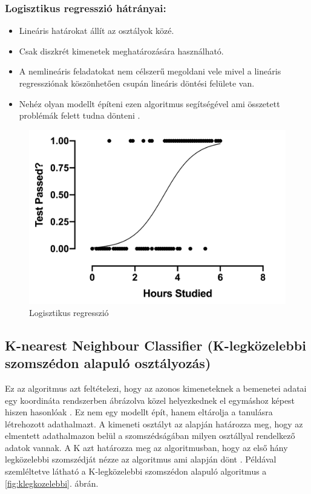 \subsubsection{Logisztikus regresszió hátrányai:}
\begin{itemize}
    \item Lineáris határokat állít az osztályok közé.
    \item Csak diszkrét kimenetek meghatározására használható.
    \item A nemlineáris feladatokat nem célszerű megoldani vele mivel a lineáris regressziónak köszönhetően csupán lineáris döntési felülete van.
    \item Nehéz olyan modellt építeni ezen algoritmus segítségével ami összetett problémák felett tudna dönteni \cite{logisztikus_regresszio_2}.
\end{itemize}

\begin{figure}[h]
    \centering
    \includegraphics[width=\linewidth]{images/3.fejezet/LogisticRegression.png}
    \caption{Logisztikus regresszió \cite{logisztikusregresszio_abra}}
    \label{fig:logisztikusregresszio}
\end{figure}

\subsection{K-nearest Neighbour Classifier (K-legközelebbi szomszédon alapuló osztályozás)}
Ez az algoritmus azt feltételezi, hogy az azonos kimeneteknek a bemenetei adatai egy koordináta rendszerben ábrázolva közel helyezkednek el egymáshoz képest hiszen hasonlóak \cite{k_legkozelebbi_2}. Ez nem egy modellt épít, hanem eltárolja a tanulásra létrehozott adathalmazt. A kimeneti osztályt az alapján határozza meg, hogy az elmentett adathalmazon belül a szomszédságában milyen osztállyal rendelkező adatok vannak. A K azt határozza meg az algoritmusban, hogy az első hány legközelebbi szomszédját nézze az algoritmus ami alapján dönt \cite{k_legkozelebbi_1}. Példával szemléltetve látható a K-legközelebbi szomszédon alapuló algoritmus a \ref{fig:klegkozelebbi}. ábrán.


